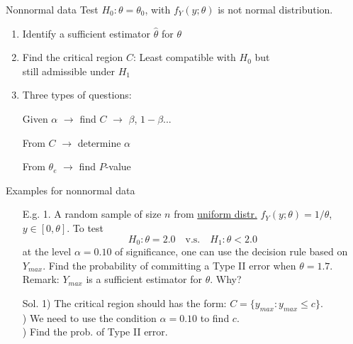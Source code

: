 \begin{frame}{Nonnormal data}
	Test $H_0:\theta = \theta_0$, with $f_Y(y;\theta)$ is not normal distribution. \pause
	\vfill
	\begin{enumerate}
		\item Identify a sufficient estimator $\widehat\theta$ for $\theta$
			\vfill
		\item Find the critical region $C$:  Least compatible with $H_0$ but \\
			\hspace{12em} still admissible under $H_1$
			\vfill
		\item Three types of questions:
    \item[] Given $\alpha$ $\rightarrow$ find $C$ \pause $\rightarrow$ $\beta$, $1-\beta$...\\
		\item[] From $C$  $\rightarrow$ determine $\alpha$ \\
		\item[] From $\theta_e$ $\rightarrow$ find $P$-value
	\end{enumerate}
\end{frame}
\begin{frame}{Examples for nonnormal data}

 \begin{enumerate}
	 \item[E.g. 1.] A random sample of size $n$ from \underline{uniform distr.}
		 $f_Y(y;\theta)=1/\theta$, $y\in[0,\theta]$. To test
		 \[
			 H_0:\theta=2.0 \quad\text{v.s.}\quad H_1: \theta<2.0
		 \]
		 at the level $\alpha=0.10$ of significance, one can use the decision rule based on
		 $Y_{max}$. Find the probability of committing a Type II error when $\theta=1.7$.\\[1em]
		 Remark: $Y_{max}$ is a sufficient estimator for $\theta$. Why?
	\pause	 \vfill
\item[Sol.]
	 1) The critical region should has the form: $C=\{y_{max}: y_{max}\le c\}$. \\[1em] ) We need to use the condition $\alpha=0.10$ to find $c$.\\[1em] ) Find the prob. of Type II error.
 \end{enumerate}

\end{frame}
